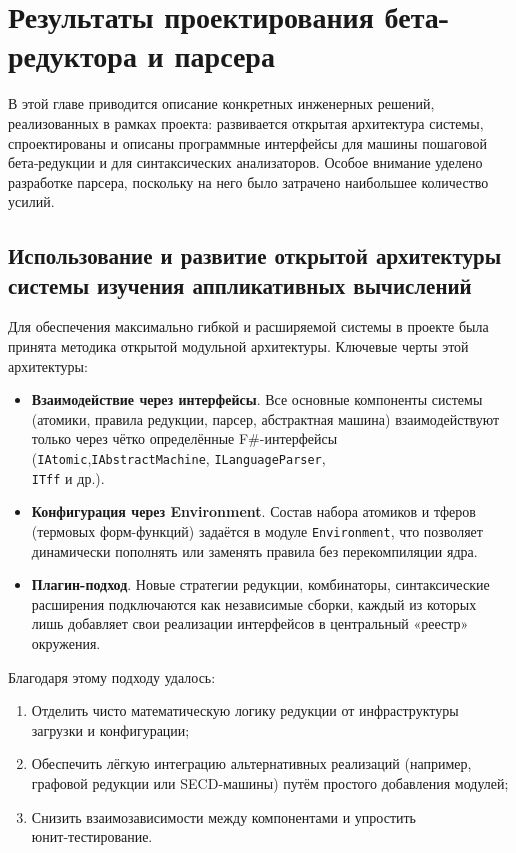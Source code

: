 \chapter{Результаты проектирования бета-редуктора и парсера}
\label{chapter3}

В этой главе приводится описание конкретных инженерных решений, реализованных в рамках проекта: развивается открытая архитектура системы, спроектированы и описаны программные интерфейсы для машины пошаговой бета‑редукции и для синтаксических анализаторов. Особое внимание уделено разработке парсера, поскольку на него было затрачено наибольшее количество усилий.

\section{Использование и развитие открытой архитектуры системы изучения аппликативных вычислений}
\label{sec:open-architecture}

Для обеспечения максимально гибкой и расширяемой системы в проекте была принята методика открытой модульной архитектуры.  
Ключевые черты этой архитектуры:
\begin{itemize}
  \item \textbf{Взаимодействие через интерфейсы}. Все основные компоненты системы (атомики, правила редукции, парсер, абстрактная машина) взаимодействуют только через чётко определённые F\#-интерфейсы (\texttt{IAtomic},\texttt{IAbstractMachine}, \texttt{ILanguageParser},\\\texttt{ITff}  и др.).
  \item \textbf{Конфигурация через Environment}. Состав набора атомиков и тферов (термовых форм-функций) задаётся в модуле \texttt{Environment}, что позволяет динамически пополнять или заменять правила без перекомпиляции ядра.
  \item \textbf{Плагин-подход}. Новые стратегии редукции, комбинаторы, синтаксические расширения подключаются как независимые сборки, каждый из которых лишь добавляет свои реализации интерфейсов в центральный «реестр» окружения.
\end{itemize}

Благодаря этому подходу удалось:
\begin{enumerate}
  \item Отделить чисто математическую логику редукции от инфраструктуры загрузки и конфигурации;
  \item Обеспечить лёгкую интеграцию альтернативных реализаций (например, графовой редукции или SECD‑машины) путём простого добавления модулей;
  \item Снизить взаимозависимости между компонентами и упростить юнит‑тестирование.
\end{enumerate}

